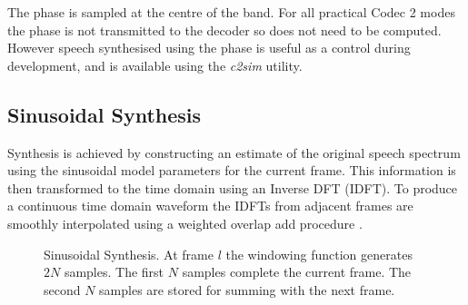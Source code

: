 \documentclass{article}
\begin{document}
{The phase is sampled at the centre of the band.  For all practical Codec 2 modes the phase is not transmitted to the decoder so does not need to be computed.  However speech synthesised using the phase is useful as a control during development, and is available using the \emph{c2sim} utility.

\subsection{Sinusoidal Synthesis}

Synthesis is achieved by constructing an estimate of the original speech spectrum using the sinusoidal model parameters for the current frame. This information is then transformed to the time domain using an Inverse DFT (IDFT). To produce a continuous time domain waveform the IDFTs from adjacent frames are smoothly interpolated using a weighted overlap add procedure \cite{mcaulay1986speech}.

\begin{figure}[h]
\caption{Sinusoidal Synthesis.  At frame $l$ the windowing function generates $2N$ samples.  The first $N$ samples complete the current frame. The second $N$ samples are stored for summing with the next frame.}
\label{fig:synthesis}
\begin{center}
\end{center}
\end{figure}}
\end{document}
